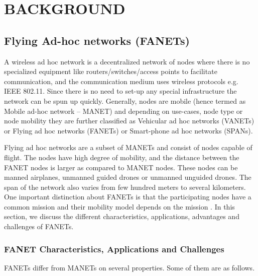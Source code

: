 \chapter{BACKGROUND}
\label{chap-two}

\section{Flying Ad-hoc networks (FANETs)}

A wireless ad hoc network is a decentralized network of nodes where there is no specialized equipment like routers/switches/access points to facilitate communication, and the communication medium uses wireless protocols e.g. IEEE 802.11. Since there is no need to set-up any special infrastructure the network can be spun up quickly. Generally, nodes are mobile (hence termed as Mobile ad-hoc network – MANET) and depending on use-cases, node type or node mobility they are further classified as Vehicular ad hoc networks (VANETs) or Flying ad hoc networks (FANETs) or Smart-phone ad hoc networks (SPANs).

Flying ad hoc networks are a subset of MANETs and consist of nodes capable of flight. The nodes have high degree of mobility, and the distance between the FANET nodes is larger as compared to MANET nodes. These nodes can be manned airplanes, unmanned guided drones or unmanned unguided drones. The span of the network also varies from few hundred meters to several kilometers. One important distinction about FANETs is that the participating nodes have a common mission and their mobility model depends on the mission \cite{OUBBATI201729}. In this section, we discuss the different characteristics, applications, advantages and challenges of FANETs.

\subsection{FANET Characteristics, Applications and Challenges}

FANETs differ from MANETs on several properties. Some of them are as follows.

